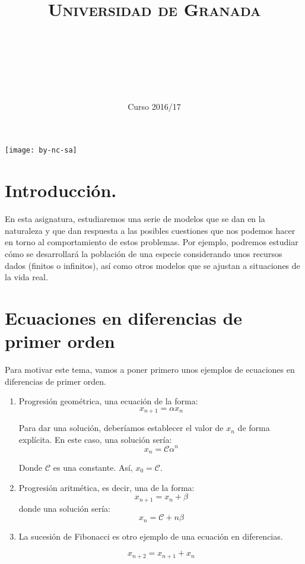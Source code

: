 \documentclass[11pt, a4paper, titlepage]{article}
\title{
  \normalfont \normalsize 
  \textsc{Universidad de Granada} \\ [25pt]    %
  \horrule{0.5pt} \\[0.4cm] %
  \huge \subject\\ %
  \horrule{2pt} \\[0.5cm] %
}
\author{\Large{\docauthor}}
\date{\vspace{-1.5em} \normalsize Curso 2016/17}
\theoremstyle{theorem-style}
\theoremstyle{definition-style}
\theoremstyle{remark-style}
\theoremstyle{example-style}
\begin{document}
\maketitle  %
\tableofcontents    %
\vfill
\begin{center}
\texttt{[image: by-nc-sa]}  %
\end{center}
\newpage


\section*{Introducción.}
En esta asignatura, estudiaremos una serie de modelos que se dan en la naturaleza y que dan respuesta a las posibles cuestiones que nos podemos hacer en torno al comportamiento de estos problemas. Por ejemplo, podremos estudiar cómo se desarrollará la población de una especie considerando unos recursos dados (finitos o infinitos), así como otros modelos que se ajustan a situaciones de la vida real.



\newpage

\section{Ecuaciones en diferencias de primer orden}

Para motivar este tema, vamos a poner primero unos ejemplos de ecuaciones en diferencias de primer orden.

\begin{enumerate}
	\item Progresión geométrica, una ecuación de la forma:
\[
x_{n+1} =  \alpha x_n
\]

Para dar una solución, deberíamos establecer el valor de $x_n$ de forma explícita. En este caso, una solución sería:
\[
x_n = \mathcal{C} \alpha^n
\]

Donde $\mathcal{C}$ es una constante. Así, $x_0 = \mathcal{C}$.

\item Progresión aritmética, es decir, una de la forma:
\[
x_{n+1} = x_n + \beta
\]
donde una solución sería:
\[
x_n = \mathcal{C} + n\beta
\]

\item La sucesión de Fibonacci es otro ejemplo de una ecuación en diferencias.

\[
x_{n+2} = x_{n+1} + x_{n}
\]

\end{enumerate}
\end{document}
